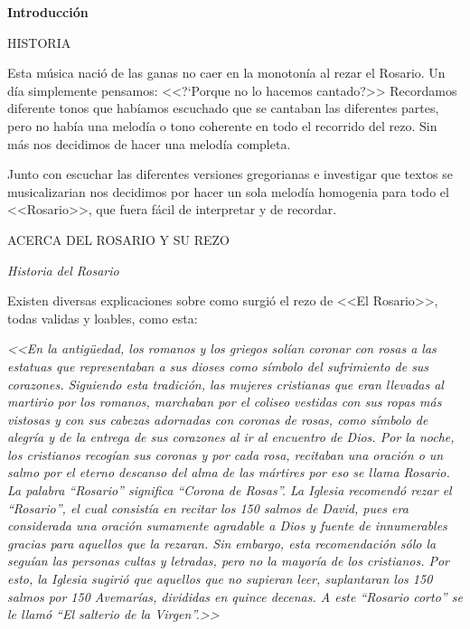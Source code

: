 \documentclass[12pt, letterpaper]{report}
\begin{document}
    \begin{center}
        \vspace*{9cm}
        \textbf{\Huge Introducci\'on}
    \end{center}
    \clearpage
    
    \LARGE HISTORIA
    
    \Large Esta música nació de las ganas no caer en la monotonía al rezar el Rosario. Un d\'ia simplemente pensamos: <<?`Porque no lo hacemos cantado?>> Recordamos diferente tonos que habíamos escuchado que se cantaban las diferentes partes, pero no había una melodía o tono coherente en todo el recorrido del rezo. Sin más nos decidimos de hacer una melodía completa.
    
    Junto con escuchar las diferentes versiones gregorianas e investigar que textos se musicalizarian nos decidimos por hacer un sola melodía homogenia para todo el <<Rosario>>, que fuera fácil de interpretar y de recordar.
    
    \LARGE ACERCA DEL ROSARIO Y SU REZO
    
    \LARGE \textit{Historia del Rosario}
    
    \Large Existen diversas explicaciones sobre como surgió el rezo de <<El Rosario>>, todas validas y loables, como esta:
    
    \Large \textit{<<En la antigüedad, los romanos y los griegos solían coronar con rosas a las estatuas que representaban a sus dioses como símbolo del sufrimiento de sus corazones. Siguiendo esta tradición, las mujeres cristianas que eran llevadas al martirio por los romanos, marchaban por el coliseo vestidas con sus ropas más vistosas y con sus cabezas adornadas con coronas de rosas, como símbolo de alegría y de la entrega de sus corazones al ir al encuentro de Dios. Por la noche, los cristianos recogían sus coronas y por cada rosa, recitaban una oración o un salmo por el eterno descanso del alma de las mártires por eso se llama Rosario. La palabra ``Rosario'' significa ``Corona de Rosas''. La Iglesia recomendó rezar el ``Rosario'', el cual consistía en recitar los 150 salmos de David, pues era considerada una oración sumamente agradable a Dios y fuente de innumerables gracias para aquellos que la rezaran. Sin embargo, esta recomendación sólo la seguían las personas cultas y letradas, pero no la mayoría de los cristianos. Por esto, la Iglesia sugirió que aquellos que no supieran leer, suplantaran los 150 salmos por 150 Avemarías, divididas en quince decenas. A este ``Rosario corto'' se le llamó ``El salterio de la Virgen''.>>} \cite{RorasioCatholicNet}
    
\end{document}
